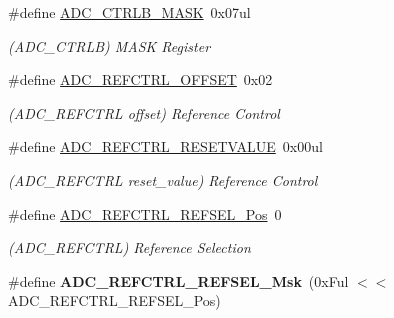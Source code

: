 \begin{DoxyCompactItemize}
\item 
\hypertarget{group___s_a_m_l21___a_d_c_ga6faca029aa90801c148382cd602fd85c}{}\#define \hyperlink{group___s_a_m_l21___a_d_c_ga6faca029aa90801c148382cd602fd85c}{A\+D\+C\+\_\+\+C\+T\+R\+L\+B\+\_\+\+M\+A\+S\+K}~0x07ul\label{group___s_a_m_l21___a_d_c_ga6faca029aa90801c148382cd602fd85c}

\begin{DoxyCompactList}\small\item\em (A\+D\+C\+\_\+\+C\+T\+R\+L\+B) M\+A\+S\+K Register \end{DoxyCompactList}\item 
\hypertarget{group___s_a_m_l21___a_d_c_ga262294683d8f13a4ca4cae27feddbfeb}{}\#define \hyperlink{group___s_a_m_l21___a_d_c_ga262294683d8f13a4ca4cae27feddbfeb}{A\+D\+C\+\_\+\+R\+E\+F\+C\+T\+R\+L\+\_\+\+O\+F\+F\+S\+E\+T}~0x02\label{group___s_a_m_l21___a_d_c_ga262294683d8f13a4ca4cae27feddbfeb}

\begin{DoxyCompactList}\small\item\em (A\+D\+C\+\_\+\+R\+E\+F\+C\+T\+R\+L offset) Reference Control \end{DoxyCompactList}\item 
\hypertarget{group___s_a_m_l21___a_d_c_ga21a914a31a46e42948558272dc5a5901}{}\#define \hyperlink{group___s_a_m_l21___a_d_c_ga21a914a31a46e42948558272dc5a5901}{A\+D\+C\+\_\+\+R\+E\+F\+C\+T\+R\+L\+\_\+\+R\+E\+S\+E\+T\+V\+A\+L\+U\+E}~0x00ul\label{group___s_a_m_l21___a_d_c_ga21a914a31a46e42948558272dc5a5901}

\begin{DoxyCompactList}\small\item\em (A\+D\+C\+\_\+\+R\+E\+F\+C\+T\+R\+L reset\+\_\+value) Reference Control \end{DoxyCompactList}\item 
\hypertarget{group___s_a_m_l21___a_d_c_ga7b8a65054da09cd11886d730594eb8d3}{}\#define \hyperlink{group___s_a_m_l21___a_d_c_ga7b8a65054da09cd11886d730594eb8d3}{A\+D\+C\+\_\+\+R\+E\+F\+C\+T\+R\+L\+\_\+\+R\+E\+F\+S\+E\+L\+\_\+\+Pos}~0\label{group___s_a_m_l21___a_d_c_ga7b8a65054da09cd11886d730594eb8d3}

\begin{DoxyCompactList}\small\item\em (A\+D\+C\+\_\+\+R\+E\+F\+C\+T\+R\+L) Reference Selection \end{DoxyCompactList}\item 
\hypertarget{group___s_a_m_l21___a_d_c_ga097bcd9a6d5327ca7d482630a5cdd106}{}\#define {\bfseries A\+D\+C\+\_\+\+R\+E\+F\+C\+T\+R\+L\+\_\+\+R\+E\+F\+S\+E\+L\+\_\+\+Msk}~(0x\+Ful $<$$<$ A\+D\+C\+\_\+\+R\+E\+F\+C\+T\+R\+L\+\_\+\+R\+E\+F\+S\+E\+L\+\_\+\+Pos)\label{group___s_a_m_l21___a_d_c_ga097bcd9a6d5327ca7d482630a5cdd106}


\end{DoxyCompactItemize}
